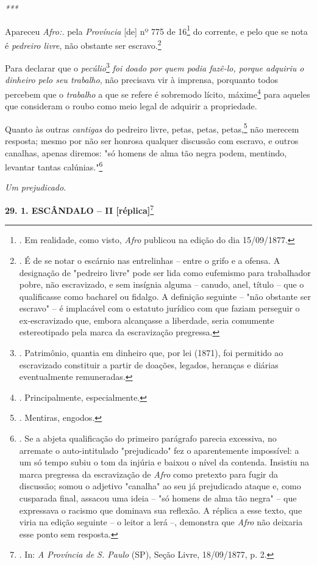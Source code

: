 \emph{***}

Apareceu \emph{Afro:.} pela \emph{Província} {[}de{]} nº 775 de
16\footnote{. Em realidade, como visto, \emph{Afro} publicou na edição
  do dia 15/09/1877.} do corrente, e pelo que se nota é \emph{pedreiro
livre}, não obstante ser escravo.\footnote{. É de se notar o escárnio
  nas entrelinhas -- entre o grifo e a ofensa. A designação de "pedreiro
  livre" pode ser lida como eufemismo para trabalhador pobre, não
  escravizado, e sem insígnia alguma -- canudo, anel, título -- que o
  qualificasse como bacharel ou fidalgo. A definição seguinte -- "não
  obstante ser escravo" -- é implacável com o estatuto jurídico com que
  faziam perseguir o ex-escravizado que, embora alcançasse a liberdade,
  seria comumente estereotipado pela marca da escravização pregressa.}

Para declarar que o \emph{pecúlio}\footnote{. Patrimônio, quantia em
  dinheiro que, por lei (1871), foi permitido ao escravizado constituir
  a partir de doações, legados, heranças e diárias eventualmente
  remuneradas.} \emph{foi doado por quem podia fazê-lo, porque adquiriu
o dinheiro pelo seu trabalho}, não precisava vir à imprensa, porquanto
todos percebem que o \emph{trabalho} a que se refere é sobremodo lícito,
máxime\footnote{. Principalmente, especialmente.} para aqueles que
consideram o roubo como meio legal de adquirir a propriedade.

Quanto às outras \emph{cantigas} do pedreiro livre, petas, petas,
petas,\footnote{. Mentiras, engodos.} não merecem resposta; mesmo por
não ser honrosa qualquer discussão com escravo, e outros canalhas,
apenas diremos: "só homens de alma tão negra podem, mentindo, levantar
tantas calúnias."\footnote{. Se a abjeta qualificação do primeiro
  parágrafo parecia excessiva, no arremate o auto-intitulado
  "prejudicado" fez o aparentemente impossível: a um só tempo subiu o
  tom da injúria e baixou o nível da contenda. Insistiu na marca
  pregressa da escravização de \emph{Afro} como pretexto para fugir da
  discussão; somou o adjetivo "canalha" ao seu já prejudicado ataque e,
  como cusparada final, assacou uma ideia -- "só homens de alma tão
  negra" -- que expressava o racismo que dominava sua reflexão. A
  réplica a esse texto, que viria na edição seguinte -- o leitor a lerá
  --, demonstra que \emph{Afro} não deixaria esse ponto sem resposta.}

\protect\hypertarget{Secao_Sem_Titulo-40}{}{}\emph{Um prejudicado.}

\textbf{29. 1. ESCÂNDALO -- II {[}réplica{]}}\footnote{. In: \emph{A
  Província de S. Paulo} (SP), Seção Livre, 18/09/1877, p. 2.}

